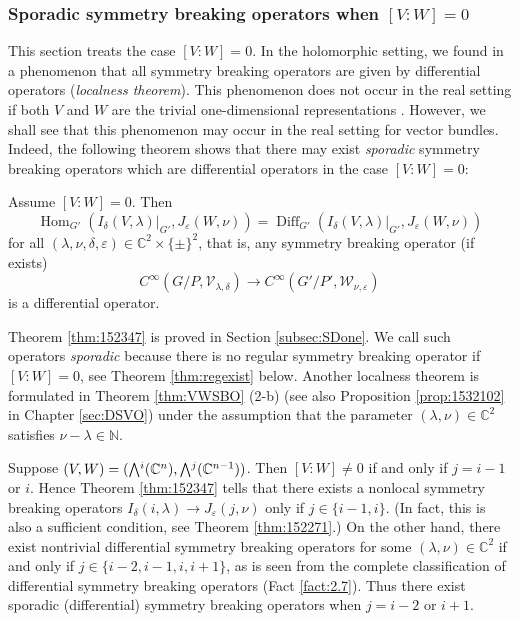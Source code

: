 \subsubsection{Sporadic symmetry breaking operators
 when $[V:W]=0$}
\label{subsec:SBOVW2}
This section treats the case $[V:W]=0$.  
In the holomorphic setting,
 we found in \cite{KP1} a phenomenon 
 that all symmetry breaking operators
 are given by differential operators
 ({\it{localness theorem}}).  
This phenomenon does not occur 
 in the real setting
 if both $V$ and $W$ are the trivial one-dimensional representations
 \cite{sbon}.  
However,
 we shall see that this phenomenon may occur
 in the real setting for vector bundles.  
Indeed, 
 the following theorem shows that 
 there may exist 
{\it{sporadic}} symmetry breaking operators
 which are differential operators
 in the case $[V:W]=0$:
\begin{theorem}
\label{thm:152347}
Assume $[V:W] = 0$.  
Then 
\[
{\operatorname{Hom}}_{G'}(I_{\delta}(V,\lambda)|_{G'}, J_{\varepsilon}(W, \nu))
  =
{\operatorname{Diff}}_{G'}(I_{\delta}(V,\lambda)|_{G'}, J_{\varepsilon}(W, \nu))
\]
for all $(\lambda,\nu,\delta,\varepsilon) \in {\mathbb{C}}^2 \times \{\pm\}^2$, 
 that is, 
any symmetry breaking operator
 (if exists)
\[
   C^{\infty}(G/P, {\mathcal{V}}_{\lambda,\delta})
   \to 
   C^{\infty}(G'/P', {\mathcal{W}}_{\nu,\varepsilon})
\]
is a differential operator.  
\end{theorem}



Theorem \ref{thm:152347} is proved
 in Section \ref{subsec:SDone}.  
We call such operators {\it{sporadic}}
 because there is no regular symmetry breaking operator
 if $[V:W]=0$, 
 see Theorem \ref{thm:regexist} below.  
Another localness theorem is formulated 
 in Theorem \ref{thm:VWSBO} (2-b)
 (see also Proposition \ref{prop:1532102} in Chapter \ref{sec:DSVO})
 under the assumption
 that the parameter 
$(\lambda,\nu)
 \in {\mathbb{C}}^2$
 satisfies $\nu-\lambda \in {\mathbb{N}}$.  
\begin{example}
\label{ex:3.3}
Suppose $(V,W)=(\Exterior^i({\mathbb{C}}^n), \Exterior^j({\mathbb{C}}^{n-1}))$.  
Then $[V:W] \ne 0$
 if and only if $j=i-1$ or $i$.  
Hence Theorem \ref{thm:152347} tells that 
 there exists a nonlocal symmetry breaking operators
$
I_{\delta}(i,\lambda)  \to J_{\varepsilon}(j, \nu) 
$
 only if $j \in \{i-1, i\}$.  
(In fact,
 this is also a sufficient condition,
 see Theorem \ref{thm:152271}.)
On the other hand,
 there exist nontrivial differential symmetry breaking operators
 for some $(\lambda, \nu) \in {\mathbb{C}}^2$
 if and only if $j \in \{i-2, i-1, i, i+1\}$, 
 as is seen from the complete classification
 of differential symmetry breaking operators 
 (Fact \ref{fact:2.7}).  
Thus there exist sporadic (differential) symmetry breaking operators
 when $j=i-2$ or $i+1$.  
\end{example}

